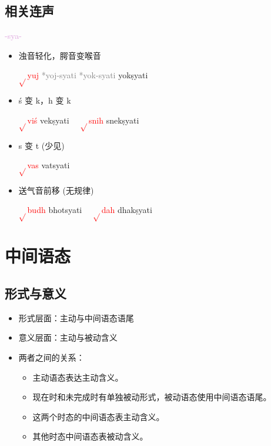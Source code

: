 \documentclass[17pt]{beamer}
\newcommand{\verbroot}[1]{\textcolor{red}{$\sqrt{}$#1}}
\newcommand{\fullpada}[1]{\textcolor{OliveGreen}{#1}}
\newcommand{\pratyaya}[1]{\textcolor{Plum}{#1}}
\newcommand{\reconstruction}[1]{\textcolor{gray}{*#1}}
\begin{document}
\subsection{相关连声}
\begin{frame}{\pratyaya{\nobreakdash-sya\nobreakdash-} \insertsubsection}
  \begin{itemize}
    \item 浊音轻化，腭音变喉音

    \verbroot{yuj}  \reconstruction{yoj\nobreakdash-syati}  \reconstruction{yok\nobreakdash-syati} \fullpada{yokṣyati}
    \item ś 变 k，h 变 k
    
    \verbroot{viś} \fullpada{vekṣyati} ~~\verbroot{snih} \fullpada{snekṣyati}
    \item s 变 t (少见)  
    
    \verbroot{vas} \fullpada{vatsyati} 
    \item 送气音前移 (无规律)

    \verbroot{budh} \fullpada{bhotsyati} ~~\verbroot{dah} \fullpada{dhakṣyati}
  \end{itemize}
\end{frame}

\section{中间语态}
\begin{frame}{\insertsection }
    \small
    \tableofcontents[currentsection]
\end{frame}

\subsection{形式与意义}
\begin{frame}{\insertsubsection }
  \begin{itemize}
    \item 形式层面：主动与中间语态语尾
    \item 意义层面：主动与被动含义
    \item 两者之间的关系：
    \begin{itemize}
      \item 主动语态表达主动含义。
      \item 现在时和未完成时有单独被动形式，被动语态使用中间语态语尾。
      \item 这两个时态的中间语态表主动含义。
      \item 其他时态中间语态表被动含义。
    \end{itemize}    
  \end{itemize}
\end{frame}
\end{document}
